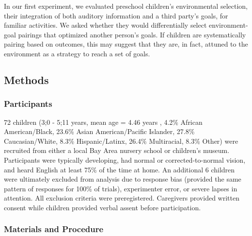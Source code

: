 \documentclass[10pt, letterpaper]{article}
\begin{document}
In our first experiment, we evaluated preschool children's environmental
selection, their integration of both auditory information and a third
party's goals, for familiar activities. We asked whether they would
differentially select environment-goal pairings that optimized another
person's goals. If children are systematically pairing based on
outcomes, this may suggest that they are, in fact, attuned to the
environment as a strategy to reach a set of goals.

\hypertarget{methods}{%
\subsection{Methods}\label{methods}}

\hypertarget{participants}{%
\subsubsection{Participants}\label{participants}}

72 children (3;0 - 5;11 years, mean age = 4.46 years , 4.2\% African
American/Black, 23.6\% Asian American/Pacific Islander, 27.8\%
Caucasian/White, 8.3\% Hispanic/Latinx, 26.4\% Multiracial, 8.3\% Other)
were recruited from either a local Bay Area nursery school or children's
museum. Participants were typically developing, had normal or
corrected-to-normal vision, and heard English at least 75\% of the time
at home. An additional 6 children were ultimately excluded from analysis
due to response bias (provided the same pattern of responses for 100\%
of trials), experimenter error, or severe lapses in attention. All
exclusion criteria were preregistered. Caregivers provided written
consent while children provided verbal assent before participation.

\hypertarget{materials-and-procedure}{%
\subsubsection{Materials and Procedure}\label{materials-and-procedure}}
\end{document}
